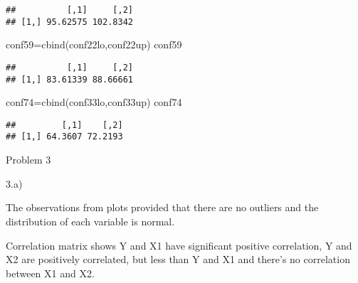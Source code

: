 \documentclass[
]{article}
\newenvironment{Shaded}{\begin{snugshade}}{\end{snugshade}}
\newcommand{\AttributeTok}[1]{\textcolor[rgb]{0.77,0.63,0.00}{#1}}
\newcommand{\ConstantTok}[1]{\textcolor[rgb]{0.00,0.00,0.00}{#1}}
\newcommand{\FunctionTok}[1]{\textcolor[rgb]{0.00,0.00,0.00}{#1}}
\newcommand{\NormalTok}[1]{#1}
\newcommand{\OtherTok}[1]{\textcolor[rgb]{0.56,0.35,0.01}{#1}}
\newcommand{\SpecialCharTok}[1]{\textcolor[rgb]{0.00,0.00,0.00}{#1}}
\newcommand{\StringTok}[1]{\textcolor[rgb]{0.31,0.60,0.02}{#1}}
\begin{document}
\begin{verbatim}
##          [,1]     [,2]
## [1,] 95.62575 102.8342
\end{verbatim}

\begin{Shaded}
\begin{Highlighting}[]
\NormalTok{conf59}\OtherTok{=}\FunctionTok{cbind}\NormalTok{(conf22lo,conf22up)}
\NormalTok{conf59}
\end{Highlighting}
\end{Shaded}

\begin{verbatim}
##          [,1]     [,2]
## [1,] 83.61339 88.66661
\end{verbatim}

\begin{Shaded}
\begin{Highlighting}[]
\NormalTok{conf74}\OtherTok{=}\FunctionTok{cbind}\NormalTok{(conf33lo,conf33up)}
\NormalTok{conf74}
\end{Highlighting}
\end{Shaded}

\begin{verbatim}
##         [,1]    [,2]
## [1,] 64.3607 72.2193
\end{verbatim}

Problem 3

3.a)

The observations from plots provided that there are no outliers and the
distribution of each variable is normal.

Correlation matrix shows Y and X1 have significant positive correlation,
Y and X2 are positively correlated, but less than Y and X1 and there's
no correlation between X1 and X2.

\begin{Shaded}
\end{Shaded}
\end{document}
